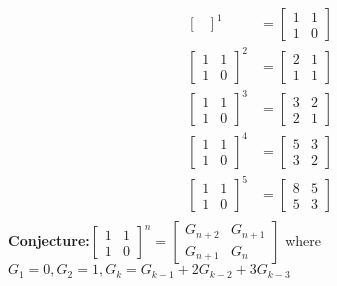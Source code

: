 \documentclass[12pt,letterpaper, onecolumn]{exam}
\begin{document}
\begin{questions}
\begin{solution}
\begin{align*}
\begin{bmatrix}
				\end{bmatrix}^1&=\begin{bmatrix}
				1 & 1\\ 
				1 & 0
				\end{bmatrix}\\
					\begin{bmatrix}
					1 & 1\\ 
					1 & 0
				\end{bmatrix}^2&=\begin{bmatrix}
					2 & 1\\ 
					1 & 1
				\end{bmatrix}\\
					\begin{bmatrix}
					1 & 1\\ 
					1 & 0
				\end{bmatrix}^3&=\begin{bmatrix}
					3 & 2\\ 
					2 & 1
				\end{bmatrix}\\
						\begin{bmatrix}
					1 & 1\\ 
					1 & 0
				\end{bmatrix}^4&=\begin{bmatrix}
					5 & 3\\ 
					3 & 2
				\end{bmatrix}\\
							\begin{bmatrix}
					1 & 1\\ 
					1 & 0
				\end{bmatrix}^5&=\begin{bmatrix}
					8 & 5\\ 
					5 & 3
				\end{bmatrix}\\
			\end{align*}
			\textbf{Conjecture:}$\begin{bmatrix}
				1 & 1\\
				1 & 0
			\end{bmatrix}^n=\begin{bmatrix}
				G_{n+2} & G_{n+1}\\
				G_{n+1}& G_{n}
			\end{bmatrix}$ where $G_1=0, G_2=1, G_k=G_{k-1}+2G_{k-2}+3G_{k-3}$
		\end{solution}
	\end{questions}


	
\end{document}
